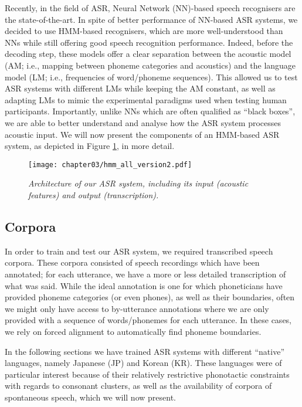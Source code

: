Recently, in the field of ASR, Neural Network (NN)-based speech recognisers are the state-of-the-art. In spite of better performance of NN-based ASR systems, we decided to use HMM-based recognisers, which are more well-understood than NNs while still offering good speech recognition performance. Indeed, before the decoding step, these models offer a clear separation between the acoustic model (AM; i.e., mapping between phoneme categories and acoustics) and the language model (LM; i.e., frequencies of word/phoneme sequences). This allowed us to test ASR systems with different LMs while keeping the AM constant, as well as adapting LMs to mimic the experimental paradigms used when testing human participants. Importantly, unlike NNs which are often qualified as ``black boxes'', we are able to better understand and analyse how the ASR system processes acoustic input. 
We will now present the components of an HMM-based ASR system, as depicted in Figure \ref{fig:hmm_architecture}, in more detail.

\begin{figure}[htb]
\centering
\texttt{[image: chapter03/hmm\_all\_version2.pdf]}
\caption{\textit{Architecture of our ASR system, including its input (acoustic features) and output (transcription).}}
\label{fig:hmm_architecture}
\end{figure}

\subsection{Corpora}

In order to train and test our ASR system, we required transcribed speech corpora. These corpora consisted of speech recordings which have been annotated; for each utterance, we have a more or less detailed transcription of what was said.
While the ideal annotation is one for which phoneticians have provided phoneme categories (or even phones), as well as their boundaries, often we might only have access to by-utterance annotations where we are only provided with a sequence of words/phonemes for each utterance. In these cases, we rely on forced alignment to automatically find phoneme boundaries.

In the following sections we have trained ASR systems with different ``native'' languages, namely Japanese (JP) and Korean (KR). These languages were of particular interest because of their relatively restrictive phonotactic constraints with regards to consonant clusters, as well as the availability of corpora of spontaneous speech, which we will now present. 


